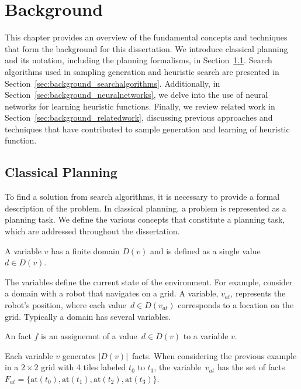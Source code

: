 \chapter{Background}
\label{sec:background}

This chapter provides an overview of the fundamental concepts and techniques that form the background for this dissertation. We introduce classical planning and its notation, including the planning formalisms, in Section~\ref{sec:background_classicalplanning}. Search algorithms used in sampling generation and heuristic search are presented in Section~\ref{sec:background_searchalgorithms}. Additionally, in Section~\ref{sec:background_neuralnetworks}, we delve into the use of neural networks for learning heuristic functions. Finally, we review related work in Section~\ref{sec:background_relatedwork}, discussing previous approaches and techniques that have contributed to sample generation and learning of heuristic function.

\section{Classical Planning}
\label{sec:background_classicalplanning}

To find a solution from search algorithms, it is necessary to provide a formal description of the problem. In classical planning, a problem is represented as a planning task. We define the various concepts that constitute a planning task, which are addressed throughout the dissertation.

\begin{definition}[Variable]\label{def:variable}
    A variable $v$ has a finite domain $D(v)$ and is defined as a single value~$d \in D(v)$.
\end{definition}

The variables define the current state of the environment. For example, consider a domain with a robot that navigates on a grid. A variable, $v_{at}$, represents the robot's position, where each value~$d \in D(v_{at})$ corresponds to a location on the grid. Typically a domain has several variables.

\begin{definition}[Fact]\label{def:fact}
    An fact $f$ is an assignemnt of a value~$d \in D(v)$ to a variable $v$.
\end{definition}

Each variable $v$ generates $|D(v)|$~facts. When considering the previous example in a $2 \times 2$ grid with 4 tiles labeled $t_0$ to $t_3$, the variable~$v_{at}$ has the set of facts~$F_{at}=\{\text{at}(t_0),\text{at}(t_1),\text{at}(t_2),\text{at}(t_3)\}$.

